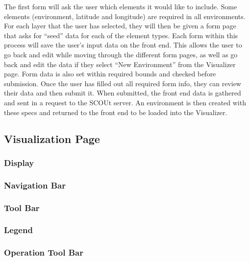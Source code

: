 The first form will ask the user which elements it would like to include.
Some elements (environment, latitude and longitude) are required in all environments.
For each layer that the user has selected, they will then be given a form page that asks for “seed” data for each of the element types.
Each form within this process will save the user’s input data on the front end.
This allows the user to go back and edit while moving through the different form pages, as well as go back and edit the data if they select “New Environment” from the Visualizer page.
Form data is also set within required bounds and checked before submission.
Once the user has filled out all required form info, they can review their data and then submit it.
When submitted, the front end data is gathered and sent in a request to the SCOUt server.
An environment is then created with these specs and returned to the front end to be loaded into the Visualizer.


\subsection{Visualization Page}


\subsubsection{Display}

\subsubsection{Navigation Bar}

\subsubsection{Tool Bar}

\subsubsection{Legend}

\subsubsection{Operation Tool Bar}
